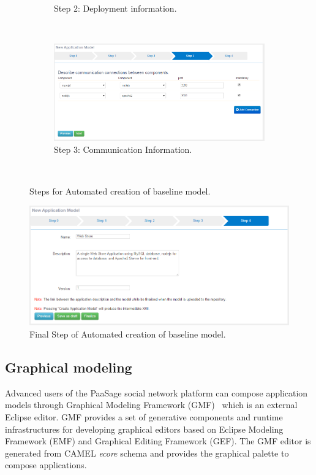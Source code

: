 \begin{figure}
\begin{subfigure}{.8\textwidth}
  \caption{Step 2: Deployment information.}
  \label{fig:sfig2}
\end{subfigure} \\[1ex]
\begin{subfigure}{.8\textwidth}
  \centering
  \includegraphics[scale=0.4]{./fig/model_creation3.png}
  \caption{Step 3: Communication Information.}
  \label{fig:sfig3}
\end{subfigure} \\[1ex]
\caption{Steps for Automated creation of baseline model.}
\label{fig:model_creation_0}
\end{figure}

\begin{figure}
  \centering
  \includegraphics[scale=0.4]{./fig/model_creation4.png}
  \caption{Final Step of Automated creation of baseline model.}
  \label{fig:sfig4}
\end{figure}

\clearpage

\subsection{Graphical modeling}
\label{sec:gmf}
Advanced users of the PaaSage social network platform can compose application models through Graphical Modeling Framework (GMF)~\cite{gmf_url} which is an external Eclipse editor. GMF provides a set of generative components and runtime infrastructures for developing graphical editors based on Eclipse Modeling Framework (EMF) and Graphical Editing Framework (GEF). The GMF editor is generated from CAMEL {\em ecore} schema and provides the graphical palette to compose applications. 

